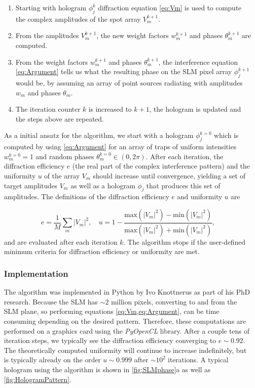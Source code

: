 \begin{enumerate}
    \item Starting with hologram $\phi_j^k$ diffraction equation \cref{eq:Vm} is used to compute the complex amplitudes of the spot array $V_m^{k+1}$. 
    
    \item From the amplitudes $V_m^{k+1}$, the new weight factors $w_m^{k+1}$ and phases $\theta_m^{k+1}$ are computed.
    
    \item From the weight factors $w_m^{k+1}$ and phases $\theta_m^{k+1}$, the interference equation \cref{eq:Argument} tells us what the resulting phase on the SLM pixel array $\phi_j^{k+1}$ would be, by assuming an array of point sources radiating with amplitudes $w_m$ and phases $\theta_m$.
    
    \item The iteration counter $k$ is increased to $k+1$, the hologram is updated and the steps above are repeated.
\end{enumerate}
As a initial ansatz for the algorithm, we start with a hologram $\phi_j^{k=0}$ which is computed by using \cref{eq:Argument} for an array of traps of uniform intensities $w_m^{k=0} = 1$ and random phases $\theta_m^{k=0} \in (0, 2\pi)$.
After each iteration, the diffraction efficiency $e$ (the real part of the complex interference pattern) and the uniformity $u$ of the array $V_m$ should increase until convergence, yielding a set of target amplitudes $V_m$ as well as a hologram $\phi_j$ that produces this set of amplitudes.
The definitions of the diffraction efficiency $e$ and uniformity $u$ are 

\begin{equation}\label{eq:EfficiencyUniformity}
    e = \frac{1}{M}\sum_m |V_m|^2, 
    \quad 
    u = 1-\frac{\text{max}(|V_m|^2)-\text{min}(|V_m|^2)}{\text{max}(|V_m|^2)+\text{min}(|V_m|^2)},
\end{equation}
and are evaluated after each iteration $k$. 
The algorithm stops if the user-defined minimum criteria for diffraction efficiency or uniformity are met.

\subsubsection*{Implementation}

The algorithm was implemented in Python by Ivo Knottnerus as part of his PhD research.
Because the SLM has $\sim 2$ million pixels, converting to and from the SLM plane, so performing equations \cref{eq:Vm,eq:Argument}, can be time consuming depending on the desired pattern.
Therefore, these computations are performed on a graphics card using the \textit{PyOpenCL} library. 
After a couple tens of iteration steps, we typically see the diffraction efficiency converging to $e \sim 0.92$.
The theoretically computed uniformity will continue to increase indefinitely, but is typically already on the order $u \sim 0.999$ after $\sim 10^2$ iterations.
A typical hologram using the algorithm is shown in \ref{fig:SLMphase}a as well as \ref{fig:HologramPattern}.


